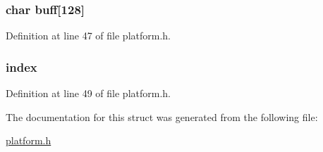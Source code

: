 \hypertarget{struct____dbg__hook_a347b80c6b82d149467f123c6a95679cf}{
\subsubsection[{buff}]{\setlength{\rightskip}{0pt plus 5cm}char {\bf buff}\mbox{[}128\mbox{]}}}
\label{struct____dbg__hook_a347b80c6b82d149467f123c6a95679cf}


Definition at line 47 of file platform.h.

\hypertarget{struct____dbg__hook_aae5a12e607d0f782506d9e6ec6179c64}{
\subsubsection[{index}]{ {\bf index}}}
\label{struct____dbg__hook_aae5a12e607d0f782506d9e6ec6179c64}


Definition at line 49 of file platform.h.



The documentation for this struct was generated from the following file:\begin{DoxyCompactItemize}
\item 
\hyperlink{platform_8h}{platform.h}\end{DoxyCompactItemize}
